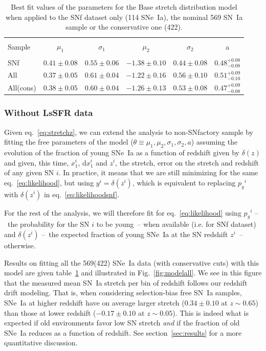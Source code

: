 \documentclass[]{aa} %
\newcommand{\mr}[1]{{\textcolor[rgb]{0.60,0.10,0.6}{#1}}}
\newcommand{\nn}[1]{{\textcolor[rgb]{1, 0.27, 0}{#1}}}
\begin{document}
\begin{table}
    \centering
    \caption{Best fit values of the parameters for the Base stretch distribution
    model when applied to the SNf dataset only (114 SNe~Ia), the nominal 569
SN~Ia sample or the conservative one (422).}
    \label{tab:modelresults}
    \begin{tabular}{l c c c c c}
    \hline\hline\\[-0.8em]
        Sample & $\mu_1$  & $\sigma_1$ &$\mu_2$  & $\sigma_2$ & a \\[0.15em]
        \hline\\[-0.8em]
        SNf & $0.41 \pm 0.08$  & $0.55 \pm 0.06$ & $-1.38 \pm 0.10$ & $0.44 \pm 0.08$ & $0.48^{+0.08}_{-0.08}$ \\[0.15em]
        All & $0.37 \pm 0.05$  & $0.61 \pm 0.04$ & $-1.22 \pm 0.16$ & $0.56 \pm 0.10$ & $0.51^{+0.09}_{-0.10}$ \\[0.15em]
        All(cons) & $0.38 \pm 0.05$  & $0.60 \pm 0.04$ & $-1.26 \pm 0.13$ & $0.53 \pm 0.08$ & $0.47^{+0.09}_{-0.08}$ \\[0.15em]
        \hline
    \end{tabular}
\end{table}

\subsubsection{Without LsSFR data}
\label{sec:modelnopy}

Given eq.~\ref{eq:stretchz}, we can extend the analysis to non-SNfactory sample
by fitting the free parameters of the model ($\theta\equiv{\mu_1, \mu_2,
\sigma_1, \sigma_2, a}$) assuming the evolution of the fraction of young SNe~Ia
as a function of redshift given by $\delta(z)$ and given, this time, $x_1^{i}$,
$\mathrm{d}x^{i}_{1}$ and $z^{i}$, the stretch, error on the stretch and
redshift of any given SN $i$. In practice, it means that we are still minimizing
for the same eq.~\ref{eq:likelihood}, but \nn{using $y^i = \delta(z^i)$, which
is equivalent to replacing $p_y{}^i$ with $\delta(z^i)$ in
eq.~\ref{eq:likelihoodsnf}.}

\mr{For the rest of the analysis, we will therefore fit for
eq.~\ref{eq:likelihood} using \nn{$p_y{}^i$} --~the
probability for the SN $i$ to be young~-- when available (i.e. for SNf
dataset) and $\delta(z^{i})$ --~the expected fraction of young SNe~Ia at the
SN redshift $z^{i}$~-- otherwise.}

\mr{Results on fitting all the 569(422) SNe~Ia data (with conservative cuts)
with this model are given table~\ref{tab:modelresults} and illustrated in
Fig.~\ref{fig:modelall}. We see in this figure that the measured mean SN~Ia
stretch per bin of redshift follows our redshift drift modeling. That is, when
considering selection-bias free SN~Ia samples, SNe~Ia at higher redshift have on
average larger stretch ($0.34 \pm 0.10$ at $z\sim0.65$) than those at lower
redshift ($-0.17\pm 0.10$ at $z\sim0.05$). This is indeed what is expected if
old environments favor low SN stretch \citep[e.g.]{howell2007} \textit{and} if
the fraction of old SNe~Ia reduces as a function of redshift. See
section~\ref{sec:results} for a more quantitative discussion.}
\end{document}
